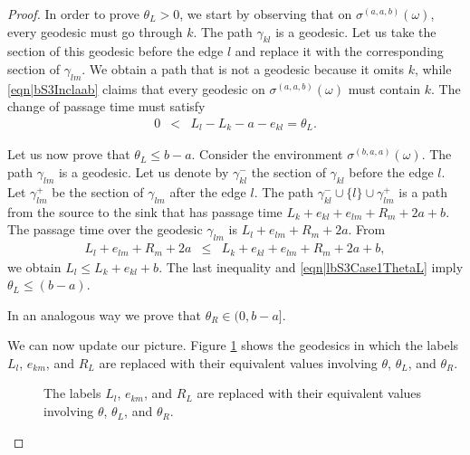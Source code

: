 \documentclass[reqno]{amsart}
\begin{document}
\begin{proof}
In order to prove
$\theta_L>0$, we start by observing that on $\sigma^{(a,a,b)}(\omega)$, every geodesic must go through $k$. The path $\gamma_{kl}$ is a geodesic. 
Let us take the section of this geodesic before the edge $l$ and replace it with the corresponding section of $\gamma_{lm}$.
We obtain a path that is not a geodesic because it omits $k$, while \eqref{eqn|bS3Inclaab} claims that every geodesic on $\sigma^{(a,a,b)}(\omega)$ must contain $k$. The change of passage time must satisfy \begin{eqnarray}0&<&L_l-L_k-a-e_{kl}= \theta_L. \label{eqn|equivalentIneqThetaL}\end{eqnarray}
 

Let us now prove that $\theta_L\leq b-a$. Consider the environment $\sigma^{(b,a,a)}(\omega)$. The path $\gamma_{lm}$ is a geodesic. Let us denote by $\gamma_{kl}^-$ the section of $\gamma_{kl}$ before the edge $l$. Let $\gamma_{lm}^+$ be the section of $\gamma_{lm}$ after the edge $l$. The path $\gamma_{kl}^-\cup\{l\}\cup \gamma_{lm}^+$ is a path from the source to the sink that has passage time $L_k+e_{kl}+e_{lm}+R_m+2a+b$. 
The passage time over the geodesic $\gamma_{lm}$ is 
$L_l+e_{lm}+R_m+2a$. From 
\begin{eqnarray*}L_l+e_{lm}+R_m+2a&\leq &L_k+e_{kl}+e_{lm}+R_m+2a+b,
\end{eqnarray*}
we obtain  $L_l  \leq L_k+e_{kl} +  b$. The last inequality and  \eqref{eqn|lbS3Case1ThetaL} imply $\theta_L\leq (b-a)$.
 
In an analogous way we prove that $\theta_R\in (0,b-a]$. 

We can now update our picture. Figure \ref{fig|lowerBound3TriangleNoAlLRAUpdated} shows the geodesics in which the labels $L_l$, $e_{km}$, and $R_L$ are replaced with their equivalent values involving $\theta$, $\theta_L$, and $\theta_R$.

 \begin{figure}[t]
 \centering
{}
\caption{The labels $L_l$, $e_{km}$, and $R_L$ are replaced with their equivalent values involving $\theta$, $\theta_L$, and $\theta_R$.}
\label{fig|lowerBound3TriangleNoAlLRAUpdated}
\end{figure}


\end{proof}
\end{document}

